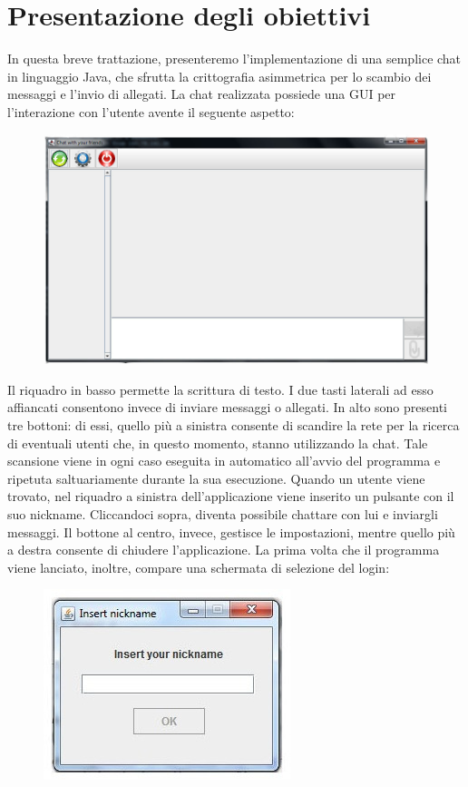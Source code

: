 \section{Presentazione degli obiettivi}
In questa breve trattazione, presenteremo l'implementazione di una semplice
chat in linguaggio Java, che sfrutta la crittografia asimmetrica per lo scambio dei
messaggi e l'invio di allegati. La chat realizzata possiede una GUI per l'interazione
con l'utente avente il seguente aspetto:
\begin{figure}[h]
\centering
\includegraphics[scale=0.4]{gui1.jpg}
\end{figure}

Il riquadro in basso permette la scrittura di testo.
I due tasti laterali ad esso affiancati
consentono invece di inviare messaggi o allegati.
In alto sono presenti tre bottoni:
di essi, quello più a sinistra consente di scandire la rete per la ricerca di eventuali 
utenti che, in questo momento, stanno utilizzando la chat.
Tale scansione viene in ogni caso eseguita in automatico all'avvio del programma
e ripetuta saltuariamente durante la sua esecuzione.
Quando un utente viene trovato, nel riquadro a sinistra 
dell'applicazione viene inserito un pulsante con il suo nickname.
Cliccandoci sopra, diventa possibile chattare con lui e inviargli messaggi.
Il bottone al centro, invece, gestisce le impostazioni,
mentre quello più a destra consente di chiudere l'applicazione.
La prima volta che il programma viene lanciato, inoltre,
compare una schermata di selezione del login:
\begin{figure}[h]
\centering
\includegraphics[scale=0.5]{login1.jpg}
\end{figure}

